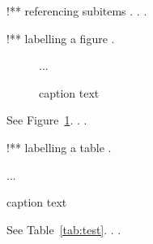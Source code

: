 !** referencing subitems
.
.
.


!** labelling a figure
.
\begin{figure}
    ...
    \caption{caption text}
    \label{fig:test}
\end{figure}
See Figure~\ref{fig:test}.
.
.


!** labelling a table
.
\begin{table}
    ...
    \caption{caption text}
    \label{tab:test}
\end{table}
See Table~\ref{tab:test}.
.
.
